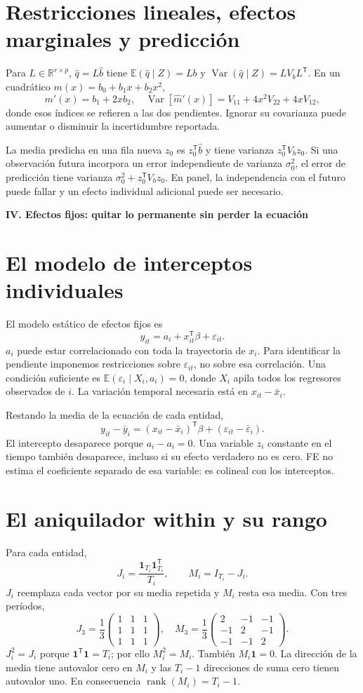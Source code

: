 \documentclass[11pt,a4paper]{article}
\newcommand{\R}{\mathbb R}
\newcommand{\E}{\mathbb E}
\newcommand{\T}{^{\mathsf T}}
\DeclareMathOperator{\Var}{Var}
\DeclareMathOperator{\rank}{rank}
\newcommand{\ones}{\mathbf 1}
\theoremstyle{definition}
\newcommand{\parte}[1]{\par\bigskip\Needspace{8\baselineskip}\begin{center}{\Large\bfseries\color{azul}#1}\end{center}}
\newcommand{\eps}{\varepsilon}
\begin{document}
\section{Restricciones lineales, efectos marginales y predicción}
Para $L\in\R^{r\times p}$, $\widehat q=L\widehat b$ tiene
$\E(\widehat q\mid Z)=Lb$ y $\Var(\widehat q\mid Z)=LV_bL\T$.
En un cuadrático $m(x)=b_0+b_1x+b_2x^2$,
\[
m'(x)=b_1+2xb_2,\quad
\Var[\widehat m'(x)]=V_{11}+4x^2V_{22}+4xV_{12},
\]
donde esos índices se refieren a las dos pendientes. Ignorar su covarianza puede aumentar o disminuir la incertidumbre reportada.

La media predicha en una fila nueva $z_0$ es $z_0\T\widehat b$ y tiene varianza $z_0\T V_bz_0$. Si una observación futura incorpora un error independiente de varianza $\sigma_0^2$, el error de predicción tiene varianza $\sigma_0^2+z_0\T V_bz_0$. En panel, la independencia con el futuro puede fallar y un efecto individual adicional puede ser necesario.



\parte{IV. Efectos fijos: quitar lo permanente sin perder la ecuación}
\section{El modelo de interceptos individuales}
El modelo estático de efectos fijos es
\[
y_{it}=a_i+x_{it}\T\beta+\eps_{it}.
\]
$a_i$ puede estar correlacionado con toda la trayectoria de $x_i$. Para identificar la pendiente imponemos restricciones sobre $\eps_{it}$, no sobre esa correlación. Una condición suficiente es
$\E(\eps_i\mid X_i,a_i)=0$, donde $X_i$ apila todos los regresores observados de $i$. La variación temporal necesaria está en $x_{it}-\bar x_i$.

Restando la media de la ecuación de cada entidad,
\[
y_{it}-\bar y_i=(x_{it}-\bar x_i)\T\beta+(\eps_{it}-\bar\eps_i).
\]
El intercepto desaparece porque $a_i-a_i=0$. Una variable $z_i$ constante en el tiempo también desaparece, incluso si su efecto verdadero no es cero. FE no estima el coeficiente separado de esa variable: es colineal con los interceptos.

\section{El aniquilador within y su rango}
Para cada entidad,
\[
J_i=\frac{\ones_{T_i}\ones_{T_i}\T}{T_i},\qquad
M_i=I_{T_i}-J_i.
\]
$J_i$ reemplaza cada vector por su media repetida y $M_i$ resta esa media. Con tres períodos,
\[
J_3=\frac13\begin{pmatrix}1&1&1\\1&1&1\\1&1&1\end{pmatrix},
\quad
M_3=\frac13\begin{pmatrix}2&-1&-1\\-1&2&-1\\-1&-1&2\end{pmatrix}.
\]
$J_i^2=J_i$ porque $\ones\T\ones=T_i$; por ello $M_i^2=M_i$. También $M_i\ones=0$. La dirección de la media tiene autovalor cero en $M_i$ y las $T_i-1$ direcciones de suma cero tienen autovalor uno. En consecuencia $\rank(M_i)=T_i-1$.
\end{document}
